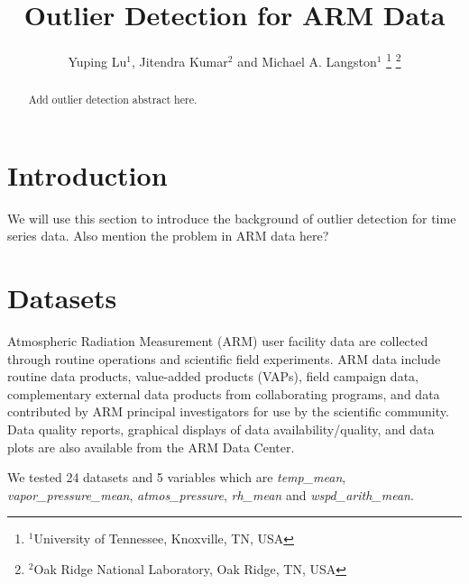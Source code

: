 \documentclass[letterpaper, 10 pt, conference]{ieeeconf}  %
\title{\LARGE \bf
Outlier Detection for ARM Data
}
\author{Yuping Lu$^{1}$, Jitendra Kumar$^{2}$ and Michael A. Langston$^{1}$%
\thanks{$^{1}$University of Tennessee, Knoxville, TN, USA}%
\thanks{$^{2}$Oak Ridge National Laboratory, Oak Ridge, TN, USA}%
}
\begin{document}
\maketitle
\thispagestyle{empty}
\pagestyle{empty}

\begin{abstract}

Add outlier detection abstract here.

\end{abstract}


\section{Introduction}
We will use this section to introduce the background of outlier detection for 
time series data. \cite{gupta2014outlier} Also mention the problem in ARM data 
here?


\section{Datasets}
Atmospheric Radiation Measurement (ARM) user facility data are collected through 
routine operations and scientific field experiments. ARM data include routine 
data products, value-added products (VAPs), field campaign data, complementary 
external data products from collaborating programs, and data contributed by ARM 
principal investigators for use by the scientific community. Data quality 
reports, graphical displays of data availability/quality, and data plots are 
also available from the ARM Data Center.

We tested 24 datasets and 5 variables which are \textit{temp\_mean}, 
\textit{vapor\_pressure\_mean}, \textit{atmos\_pressure}, 
\textit{rh\_mean} and \textit{wspd\_arith\_mean}.
\end{document}
